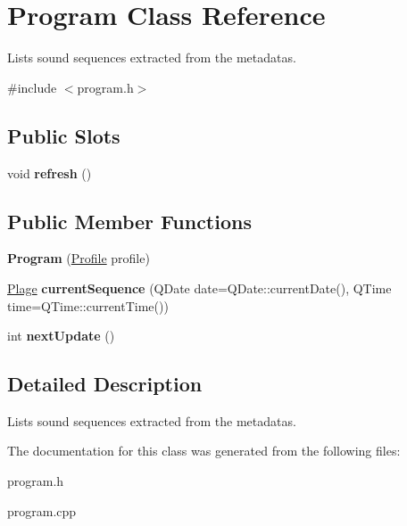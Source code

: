 \hypertarget{classProgram}{
\section{Program Class Reference}
\label{classProgram}
}


Lists sound sequences extracted from the metadatas.  




{\ttfamily \#include $<$program.h$>$}

\subsection*{Public Slots}
\begin{DoxyCompactItemize}
\item 
\hypertarget{classProgram_a37ce4d3a7267e0a43d61b33e5825da77}{
void {\bfseries refresh} ()}
\label{classProgram_a37ce4d3a7267e0a43d61b33e5825da77}

\end{DoxyCompactItemize}
\subsection*{Public Member Functions}
\begin{DoxyCompactItemize}
\item 
\hypertarget{classProgram_a6dfd373d4d7eef69a0ccbc7041b5f034}{
{\bfseries Program} (\hyperlink{classProfile}{Profile} profile)}
\label{classProgram_a6dfd373d4d7eef69a0ccbc7041b5f034}

\item 
\hypertarget{classProgram_a1d3e7a9ba86be1dd48da510866ea1013}{
\hyperlink{classPlage}{Plage} {\bfseries currentSequence} (QDate date=QDate::currentDate(), QTime time=QTime::currentTime())}
\label{classProgram_a1d3e7a9ba86be1dd48da510866ea1013}

\item 
\hypertarget{classProgram_a78384dfd15b1cd81f72b4607041ddbb5}{
int {\bfseries nextUpdate} ()}
\label{classProgram_a78384dfd15b1cd81f72b4607041ddbb5}

\end{DoxyCompactItemize}


\subsection{Detailed Description}
Lists sound sequences extracted from the metadatas. 

The documentation for this class was generated from the following files:\begin{DoxyCompactItemize}
\item 
program.h\item 
program.cpp\end{DoxyCompactItemize}
